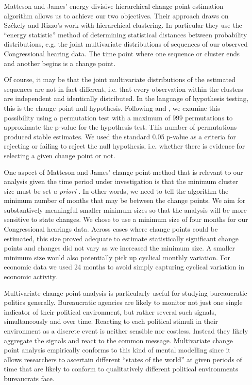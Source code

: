 \documentclass[a4paper]{article}\usepackage[]{graphicx}\usepackage[]{color}
\begin{document}
Matteson and James' \citeyearpar{Matteson2014} energy divisive hierarchical change point estimation algorithm allows us to achieve our two objectives. Their approach draws on Sz{\'e}kely and Rizzo's \citeyearpar{Szekely2005} work with hierarchical clustering. In particular they use the ``energy statistic'' method of determining statistical distances between probability distributions, e.g. the joint multivariate distributions of sequences of our observed Congressional hearing data. The time point where one sequence or cluster ends and another begins is a change point.

Of course, it may be that the joint multivariate distributions of the estimated sequences are not in fact different, i.e. that every observation within the clusters are independent and identically distributed. In the language of hypothesis testing, this is the change point null hypothesis. Following \cite{Matteson2014} and \cite{Rizzo2010}, we examine this possibility using a permutation test with a maximum of 999 permutations to approximate the p-value for the hypothesis test. This number of permutations produced stable estimates. We used the standard 0.05 p-value as a criteria for rejecting or failing to reject the null hypothesis, i.e. whether there is evidence for selecting a given change point or not.

One aspect of Matteson and James' change point method that is relevant to our analysis given the time period under investigation is that the minimum cluster size must be set \emph{a priori} \citeyearpar[337]{Matteson2014}. In other words, we need to tell the algorithm the minimum number of months that may be between the change points. We aim for substantively meaningful smaller minimum sizes so that the analysis will be more sensitive to state changes. We chose to use a minimum size of four months for our Congressional hearings data. Across cases where change points could be estimated, this size proved adequate to estimate statistically significant change points and changes did not vary as we increased the minimum size. A smaller minimum size would also potentially pick up cyclical monthly variation. For economic data we used 24 months to avoid simply capturing cyclical variation in economic activity.

Multivariate change point analysis is particularly useful for studying bureaucratic politics generally. Bureaucratic agencies are likely to monitor not just one single indicator of their political environment, but rather several such signals, simultaneously and over time. Reacting to each political stimuli in their environment as a discrete event is neither sensible nor costless. Instead they likely aggregate the signals and react to the common message. Multivariate change point analysis empirically conforms to this kind of mental modelling since it allows researchers to ascertain different ``states of the world'' at given periods of time that are likely to conform to qualitatively different political environments bureaucrats face.
\end{document}
